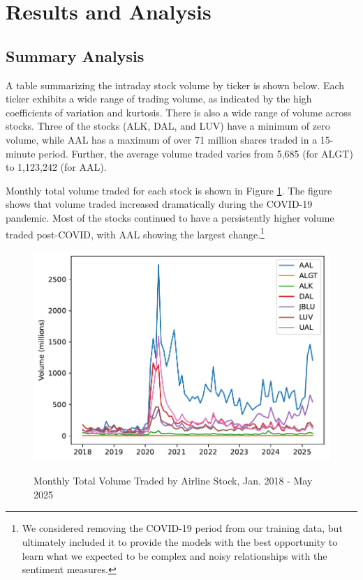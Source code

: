 \documentclass[12pt]{article}
\begin{document}
\section{Results and Analysis}
\label{section:results}
\subsection{Summary Analysis}
A table summarizing the intraday stock volume by ticker is shown below. Each ticker exhibits a wide range of trading volume, as indicated by the high coefficients of variation and kurtosis. There is also a wide range of volume across stocks. Three of the stocks (ALK, DAL, and LUV) have a minimum of zero volume, while AAL has a maximum of over 71 million shares traded in a 15-minute period. Further, the average volume traded varies from 5,685 (for ALGT) to 1,123,242 (for AAL).



Monthly total volume traded for each stock is shown in Figure \ref{fig:monthly_volume}. The figure shows that volume traded increased dramatically during the COVID-19 pandemic. Most of the stocks continued to have a persistently higher volume traded post-COVID, with AAL showing the largest change.\footnote{We considered removing the COVID-19 period from our training data, but ultimately included it to provide the models with the best opportunity to learn what we expected to be complex and noisy relationships with the sentiment measures.}
\begin{figure}[H]
    \centering
    \caption{Monthly Total Volume Traded by Airline Stock, Jan. 2018 - May 2025}
    \includegraphics[width=0.7\linewidth]{../Output/monthly_volume_plot.pdf}
    \label{fig:monthly_volume}
\end{figure}
\end{document}
